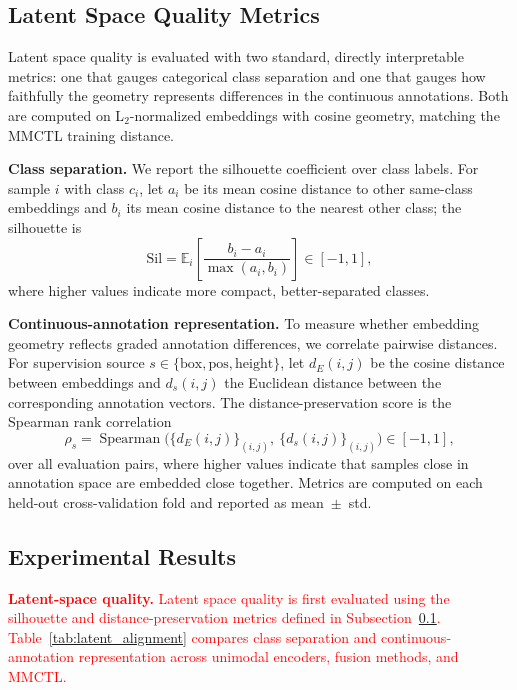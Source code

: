 \documentclass[10pt,twocolumn,letterpaper]{article}
\newcommand{\new}[1]{\textcolor{red}{#1}}
\begin{document}
\subsection{Latent Space Quality Metrics}
\label{sec:latent_space_quality_metrics}
{\color{red}
Latent space quality is evaluated with two standard, directly interpretable metrics: one that gauges categorical class separation and one that gauges how faithfully the geometry represents differences in the continuous annotations. Both are computed on L$_2$-normalized embeddings with cosine geometry, matching the MMCTL training distance.

\noindent\textbf{Class separation.}
We report the silhouette coefficient over class labels. For sample $i$ with class $c_i$, let $a_i$ be its mean cosine distance to other same-class embeddings and $b_i$ its mean cosine distance to the nearest other class; the silhouette is
\begin{equation}
\label{eq:silhouette}
\mathrm{Sil}
=
\mathbb{E}_i\!\left[
\frac{b_i - a_i}{\max(a_i, b_i)}
\right]
\in [-1, 1],
\end{equation}
where higher values indicate more compact, better-separated classes.

\noindent\textbf{Continuous-annotation representation.}
To measure whether embedding geometry reflects graded annotation differences, we correlate pairwise distances. For supervision source $s \in \{\mathrm{box}, \mathrm{pos}, \mathrm{height}\}$, let $d_E(i,j)$ be the cosine distance between embeddings and $d_s(i,j)$ the Euclidean distance between the corresponding annotation vectors. The distance-preservation score is the Spearman rank correlation
\begin{equation}
\label{eq:spearman}
\rho_s
=
\operatorname{Spearman}\big(
\{ d_E(i,j) \}_{(i,j)},\
\{ d_s(i,j) \}_{(i,j)}
\big)
\in [-1, 1],
\end{equation}
over all evaluation pairs, where higher values indicate that samples close in annotation space are embedded close together. Metrics are computed on each held-out cross-validation fold and reported as mean~$\pm$~std.
}


\subsection{Experimental Results}
\label{subsec:experimental-results}
\new{\noindent\textbf{Latent-space quality.} Latent space quality is first evaluated using the silhouette and distance-preservation metrics defined in Subsection~\ref{sec:latent_space_quality_metrics}. Table~\ref{tab:latent_alignment} compares class separation and continuous-annotation representation across unimodal encoders, fusion methods, and MMCTL.}
\end{document}

